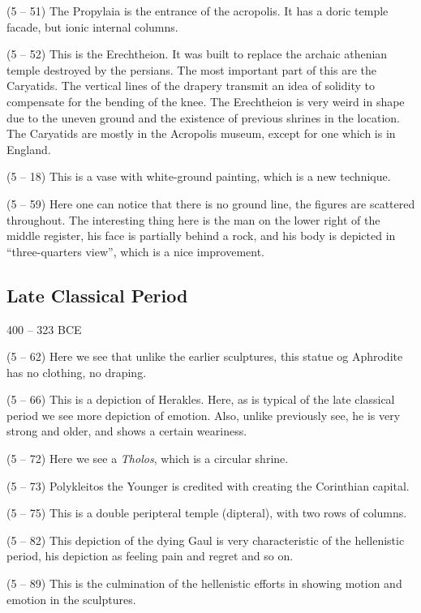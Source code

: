 \documentclass{article}
\begin{document}
    \begin{spacing}{1.2}
    \newpage
        (5 -- 51) The Propylaia is the entrance of the acropolis. It has a doric temple facade, but ionic internal columns. 

        (5 -- 52) This is the Erechtheion. It was built to replace the archaic athenian temple destroyed by the persians. The most important part of this are the Caryatids. The vertical lines of the drapery transmit an idea of solidity to compensate for the bending of the knee. The Erechtheion is very weird in shape due to the uneven ground and the existence of previous shrines in the location. The Caryatids are mostly in the Acropolis museum, except for one which is in England. 

        (5 -- 18) This is a vase with white-ground painting, which is a new technique.

        (5 -- 59) Here one can notice that there is no ground line, the figures are scattered throughout. The interesting thing here is the man on the lower right of the middle register, his face is partially behind a rock, and his body is depicted in ``three-quarters view'', which is a nice improvement. 

        \subsection{Late Classical Period}
        \begin{flushright}
            400 -- 323 BCE    
        \end{flushright}
        
        (5 -- 62) Here we see that unlike the earlier sculptures, this statue og Aphrodite has no clothing, no draping.

        (5 -- 66) This is a depiction of Herakles. Here, as is typical of the late classical period we see more depiction of emotion. Also, unlike previously see, he is very strong and older, and shows a certain weariness.

        (5 -- 72) Here we see a \emph{Tholos}, which is a circular shrine.

        (5 -- 73) Polykleitos the Younger is credited with creating the Corinthian capital.

        (5 -- 75) This is a double peripteral temple (dipteral), with two rows of columns.

        (5 -- 82) This depiction of the dying Gaul is very characteristic of the hellenistic period, his depiction as feeling pain and regret and so on. 

        (5 -- 89) This is the culmination of the hellenistic efforts in showing motion and emotion in the sculptures. 
    \end{spacing}
\end{document}
